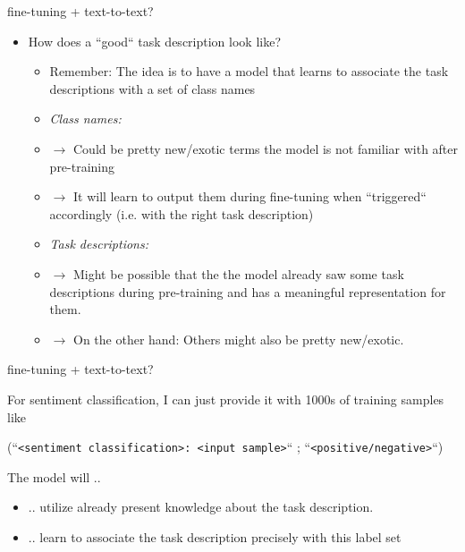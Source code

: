 \documentclass[11pt,compress,t,notes=noshow, xcolor=table]{beamer}
\begin{document}
\begin{frame}{fine-tuning + text-to-text?}

\vfill

\begin{itemize}
	\item \ques How does a ``good`` task description look like?
			\begin{itemize}
				\item Remember: The idea is to have a model that learns to associate the task descriptions with a set of class names
				\item \textit{Class names:} 
				\item[] $\to$ Could be pretty new/exotic terms the model is not familiar with after pre-training
				\item[] $\to$ It will learn to output them during fine-tuning when ``triggered`` accordingly (i.e. with the right task description)
				\item \textit{Task descriptions:} 
				\item[] $\to$ Might be possible that the the model already saw some task descriptions during pre-training and has a meaningful representation for them.
				\item[] $\to$ On the other hand: Others might also be pretty new/exotic.
			\end{itemize}
\end{itemize}

\vfill

\end{frame}


\begin{frame}{fine-tuning + text-to-text?}

\vfill

For sentiment classification, I can just provide it with 1000s of training samples like 

		\begin{center}
				{\small
					(``\texttt{<sentiment classification>: <input sample>}`` ; ``\texttt{<positive/negative>}``)
				}
		\end{center}
		
The model will ..

\begin{itemize}
	\item .. utilize already present knowledge about the task description.
	\item .. learn to associate the task description precisely with this label set
\end{itemize}

\vfill

\end{frame}
\end{document}
